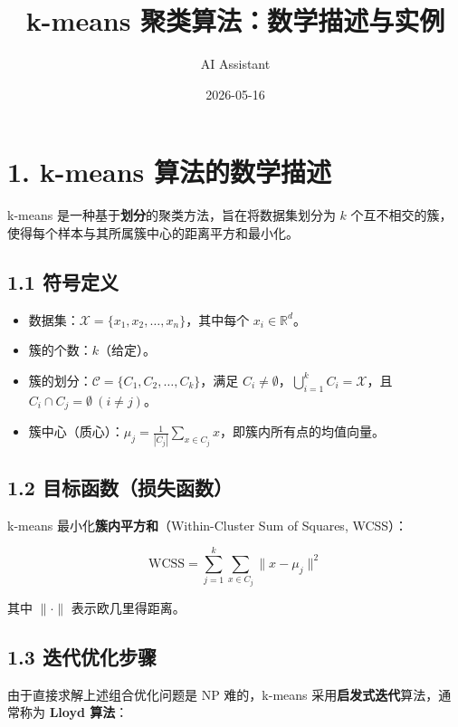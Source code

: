 \documentclass[
]{article}
\title{k-means 聚类算法：数学描述与实例}
\author{AI Assistant}
\date{2026-05-16}
\providecommand{\tightlist}{%
  \setlength{\itemsep}{0pt}\setlength{\parskip}{0pt}}
\begin{document}
\maketitle

\section{1. k-means
算法的数学描述}\label{k-means-ux7b97ux6cd5ux7684ux6570ux5b66ux63cfux8ff0}

k-means 是一种基于\textbf{划分}的聚类方法，旨在将数据集划分为 \(k\)
个互不相交的簇，使得每个样本与其所属簇中心的距离平方和最小化。

\subsection{1.1 符号定义}\label{ux7b26ux53f7ux5b9aux4e49}

\begin{itemize}
\tightlist
\item
  数据集：\(\mathcal{X} = \{x_1, x_2, \dots, x_n\}\)，其中每个
  \(x_i \in \mathbb{R}^d\)。
\item
  簇的个数：\(k\)（给定）。
\item
  簇的划分：\(\mathcal{C} = \{C_1, C_2, \dots, C_k\}\)，满足
  \(C_i \neq \emptyset\)，\(\bigcup_{i=1}^k C_i = \mathcal{X}\)，且
  \(C_i \cap C_j = \emptyset \ (i \neq j)\)。
\item
  簇中心（质心）：\(\mu_j = \frac{1}{|C_j|} \sum_{x \in C_j} x\)，即簇内所有点的均值向量。
\end{itemize}

\subsection{1.2
目标函数（损失函数）}\label{ux76eeux6807ux51fdux6570ux635fux5931ux51fdux6570}

k-means 最小化\textbf{簇内平方和}（Within-Cluster Sum of Squares,
WCSS）：

\[
\text{WCSS} = \sum_{j=1}^k \sum_{x \in C_j} \|x - \mu_j\|^2
\]

其中 \(\|\cdot\|\) 表示欧几里得距离。

\subsection{1.3
迭代优化步骤}\label{ux8fedux4ee3ux4f18ux5316ux6b65ux9aa4}

由于直接求解上述组合优化问题是 NP 难的，k-means
采用\textbf{启发式迭代}算法，通常称为 \textbf{Lloyd 算法}：
\end{document}
